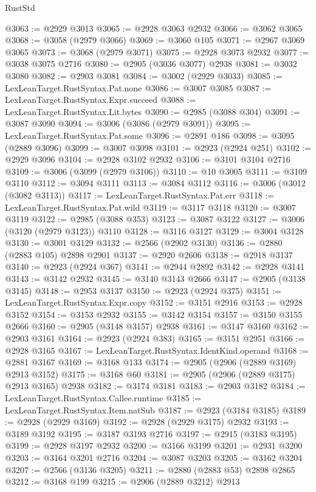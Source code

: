 \begin{lexlean}{RustStd}
\begin{coremodule}
@3063 := @2929 @3013
@3065 := @2928 @3063 @2932
@3066 := @3062 @3065
@3068 := @3058 (@2979 @3066)
@3069 := @3060 @105
@3071 := @2967 @3069 @3065
@3073 := @3068 (@2979 @3071)
@3075 := @2928 @3073 @2932
@3077 := @3038 @3075 @2716
@3080 := @2905 (@3036 @3077) @2938
@3081 := @3032 @3080
@3082 := @2903 @3081
@3084 := @3002 (@2929 @3033)
@3085 := LexLeanTarget.RustSyntax.Pat.none
@3086 := @3007 @3085
@3087 := LexLeanTarget.RustSyntax.Expr.succeed
@3088 := LexLeanTarget.RustSyntax.Lit.bytes
@3090 := @2985 (@3088 @304)
@3091 := @3087 @3090
@3094 := @3006 (@3086 (@2979 @3091))
@3095 := LexLeanTarget.RustSyntax.Pat.some
@3096 := @2891 @186
@3098 := @3095 (@2889 @3096)
@3099 := @3007 @3098
@3101 := @2923 (@2924 @251)
@3102 := @2929 @3096
@3104 := @2928 @3102 @2932
@3106 := @3101 @3104 @2716
@3109 := @3006 (@3099 (@2979 @3106))
@3110 := @10 @3005
@3111 := @3109 @3110
@3112 := @3094 @3111
@3113 := @3084 @3112
@3116 := @3006 (@3012 (@3082 @3113))
@3117 := LexLeanTarget.RustSyntax.Pat.err
@3118 := LexLeanTarget.RustSyntax.Pat.wild
@3119 := @3117 @3118
@3120 := @3007 @3119
@3122 := @2985 (@3088 @353)
@3123 := @3087 @3122
@3127 := @3006 (@3120 (@2979 @3123)) @3110
@3128 := @3116 @3127
@3129 := @3004 @3128
@3130 := @3001 @3129
@3132 := @2566 (@2902 @3130)
@3136 := @2880 (@2883 @105) @2898 @2901
@3137 := @2920 @2606
@3138 := @2918 @3137
@3140 := @2923 (@2924 @367)
@3141 := @2944 @2892
@3142 := @2928 @3141
@3143 := @3142 @2932
@3145 := @3140 @3143 @2666
@3147 := @2905 (@3138 @3145)
@3148 := @2953 @3137
@3150 := @2923 (@2924 @375)
@3151 := LexLeanTarget.RustSyntax.Expr.copy
@3152 := @3151 @2916
@3153 := @2928 @3152
@3154 := @3153 @2932
@3155 := @3142 @3154
@3157 := @3150 @3155 @2666
@3160 := @2905 (@3148 @3157) @2938
@3161 := @3147 @3160
@3162 := @2903 @3161
@3164 := @2923 (@2924 @383)
@3165 := @3151 @2951
@3166 := @2928 @3165
@3167 := LexLeanTarget.RustSyntax.IdentKind.operand
@3168 := @2881 @3167
@3169 := @3168 @133
@3174 := @2905 (@2906 (@2889 @3169) @2913 @3152)
@3175 := @3168 @60
@3181 := @2905 (@2906 (@2889 @3175) @2913 @3165) @2938
@3182 := @3174 @3181
@3183 := @2903 @3182
@3184 := LexLeanTarget.RustSyntax.Callee.runtime
@3185 := LexLeanTarget.RustSyntax.Item.natSub
@3187 := @2923 (@3184 @3185)
@3189 := @2928 (@2929 @3169)
@3192 := @2928 (@2929 @3175) @2932
@3193 := @3189 @3192
@3195 := @3187 @3193 @2716
@3197 := @2915 (@3183 @3195)
@3199 := @2928 @3197 @2932
@3200 := @3166 @3199
@3201 := @2931 @3200
@3203 := @3164 @3201 @2716
@3204 := @3087 @3203
@3205 := @3162 @3204
@3207 := @2566 (@3136 @3205)
@3211 := @2880 (@2883 @53) @2898 @2865
@3212 := @3168 @199
@3215 := @2906 (@2889 @3212) @2913

\end{coremodule}
\end{lexlean}
